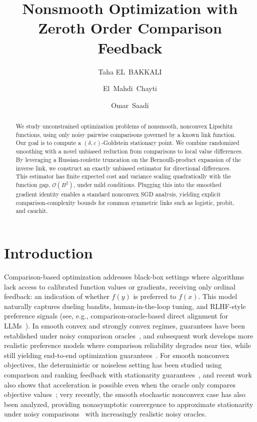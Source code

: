 \documentclass[11pt]{article}
\title{Nonsmooth Optimization with Zeroth Order Comparison Feedback}
\author[1]{Taha EL~BAKKALI}
\author[2]{El~Mahdi~Chayti}
\author[1]{Omar~Saadi}
\affil[1]{UM6P College of Computing}
\affil[2]{Machine Learning and Optimization Laboratory (MLO), EPFL}
\date{}
\theoremstyle{plain}
\theoremstyle{remark}
\newcommand{\1}{\mathbf{1}}
\begin{document}
\maketitle

\begin{abstract}
We study unconstrained optimization problems of nonsmooth, nonconvex Lipschitz functions, using only noisy pairwise comparisons governed by a known link function. Our goal is to compute a $(\delta,\varepsilon)$-Goldstein stationary point. We combine randomized smoothing with a novel unbiased reduction from comparisons to local value differences. By leveraging a Russian-roulette truncation on the Bernoulli-product expansion of the inverse link, we construct an exactly unbiased estimator for directional differences. This estimator has finite expected cost and variance scaling quadratically with the function gap, $\mathcal{O}(B^2)$, under mild conditions. Plugging this into the smoothed gradient identity enables a standard nonconvex SGD analysis, yielding explicit comparison-complexity bounds for common symmetric links such as logistic, probit, and cauchit.
\end{abstract}
\section{Introduction}
Comparison-based optimization addresses black-box settings where algorithms lack access to calibrated function values or gradients, receiving only ordinal feedback: an indication of whether $f(y)$ is preferred to $f(x)$. This model naturally captures dueling bandits, human-in-the-loop tuning, and RLHF-style preference signals (see, e.g., comparison-oracle-based direct alignment for LLMs~\cite{chen2025compo}). In smooth convex and strongly convex regimes, guarantees have been established under noisy comparison oracles~\cite{pmlr-v139-saha21b}, and subsequent work develops more realistic preference models where comparison reliability degrades near ties, while still yielding end-to-end optimization guarantees~\cite{saha2025dueling}. For smooth nonconvex objectives, the deterministic or noiseless setting has been studied using comparison and ranking feedback with stationarity guarantees~\cite{tang2024zerothorder,kadi2025on,bergou2020stochastic}, and recent work also shows that acceleration is possible even when the oracle only compares objective values~\cite{lobanov2024acceleration}; very recently, the smooth stochastic nonconvex case has also been analyzed, providing nonasymptotic convergence to approximate stationarity under noisy comparisons~\cite{bakkali2026noisy} with increasingly realistic noisy oracles.
\end{document}
